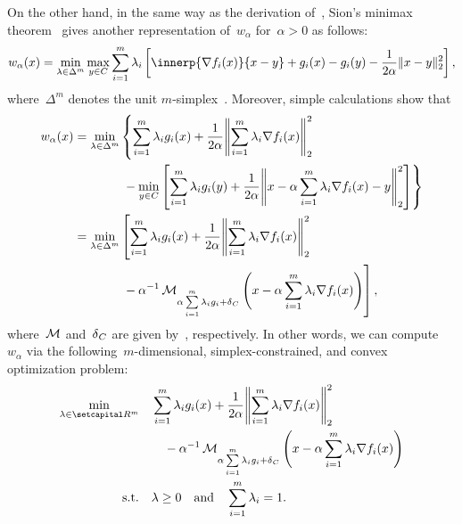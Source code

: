 \documentclass[../../main]{subfiles}
\begin{document}
On the other hand, in the same way as the derivation of~, Sion's minimax theorem~\cite{Sion1958} gives another representation of~$w_\alpha$ for~$\alpha > 0$ as follows:
\begin{equation} \label{eq:reg_lin_gap_MO_Sion}
    w_\alpha(x) = \min_{\lambda \in \Delta^m} \max_{y \in C} \sum_{i = 1}^{m} \lambda_i \left[ \innerp{\nabla f_i(x)}{x - y} + g_i(x) - g_i(y) - \frac{1}{2 \alpha} \norm{x - y}_2^2 \right]
    ,\end{equation}
where~$\Delta^m$ denotes the unit $m$-simplex~.
Moreover, simple calculations show that
\begin{equation}
    \begin{alignedat}{2}
        w_\alpha(x) &= \min_{\lambda \in \Delta^m} &&\left\{ \sum_{i = 1}^{m} \lambda_i g_i(x) + \frac{1}{2 \alpha} \norm*{\sum_{i = 1}^{m} \lambda_i \nabla f_i(x)}_2^2 \right. \\
        &&& \left. {}- \min_{y \in C} \left[ \sum_{i = 1}^{m} \lambda_i g_i(y) + \frac{1}{2 \alpha} \norm*{x - \alpha \sum_{i = 1}^{m} \lambda_i \nabla f_i(x) - y}_2^2 \right] \right\} \\
        &= \min_{\lambda \in \Delta^m} &&\left[ \sum_{i = 1}^{m} \lambda_i g_i(x) + \frac{1}{2 \alpha} \norm*{\sum_{i = 1}^{m} \lambda_i \nabla f_i(x)}_2^2 \right. \\
        &&& \left. {}- \alpha^{-1} \envelope_{\alpha \sum\limits_{i = 1}^{m} \lambda_i g_i + \indicator_C} \left( x - \alpha \sum_{i = 1}^{m} \lambda_i \nabla f_i(x) \right) \right]
        ,\end{alignedat}
\end{equation}
where~$\operatorname{\mathcal{M}}$ and~$\operatorname{\delta}_C$ are given by~, respectively.
In other words, we can compute~$w_\alpha$ via the following~$m$-dimensional, simplex-constrained, and convex optimization problem:
\begin{equation} \label{eq:dual_reg_lin_gap}
    \begin{aligned}
        \min_{\lambda \in \setR^m} &  &  & \sum_{i = 1}^{m} \lambda_i g_i(x) + \frac{1}{2 \alpha} \norm*{\sum_{i = 1}^{m} \lambda_i \nabla f_i(x)}_2^2                                                   \\
                                   &  &  & \quad - \alpha^{-1} \envelope_{\alpha \sum\limits_{i = 1}^{m} \lambda_i g_i + \indicator_C}\left( x - \alpha \sum_{i = 1}^{m} \lambda_i \nabla f_i(x) \right) \\
        \st                        &  &  & \lambda \ge 0 \eqand \sum_{i = 1}^{m} \lambda_i = 1
        .\end{aligned}
\end{equation}
\end{document}
